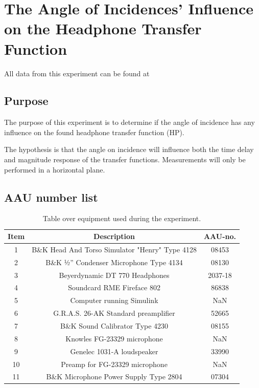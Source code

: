 
\section{The Angle of Incidences' Influence on the Headphone Transfer Function} \label{sec:AngleOfIncidence}

All data from this experiment can be found at

\subsection{Purpose}
The purpose of this experiment is to determine if the angle of incidence has any influence on the found headphone transfer function (HP). 

The hypothesis is that the angle on incidence will influence both the time delay and magnitude response of the transfer functions. Measurements will only be performed in a horizontal plane. 

\subsection{AAU number list}


\begin{table}[H]
	\centering
	\begin{tabular}{ c c c } \toprule
		{Item}	& {Description} 						& {AAU-no}. \\ \bottomrule 
		1	&	B\&K Head And Torso Simulator "Henry" Type 4128	& 08453	\\
		2	&	B\&K ½'' Condenser Microphone Type 4134 	& 08130		\\
		3	&	Beyerdynamic DT 770 Headphones				& 2037-18		\\
		4	&	Soundcard RME Fireface 802					& 86838		\\
		5	&	Computer running Simulink								& NaN		\\
		6	&	G.R.A.S. 26-AK Standard preamplifier		& 52665		\\
		7	&	B\&K Sound Calibrator Type 4230				& 08155		\\ 
		8	&	Knowles FG-23329 microphone					& NaN		\\
		9	&	Genelec 1031-A loudspeaker								& 33990		\\ 
		10	&	Preamp for FG-23329  microphone	& NaN\\
		11	& 	B\&K Microphone Power Supply Type 2804		& 07304		\\
		\bottomrule
	\end{tabular}
	\caption{Table over equipment used during the experiment.}
	\label{tab:AngleOfIncideceHP}
\end{table}

